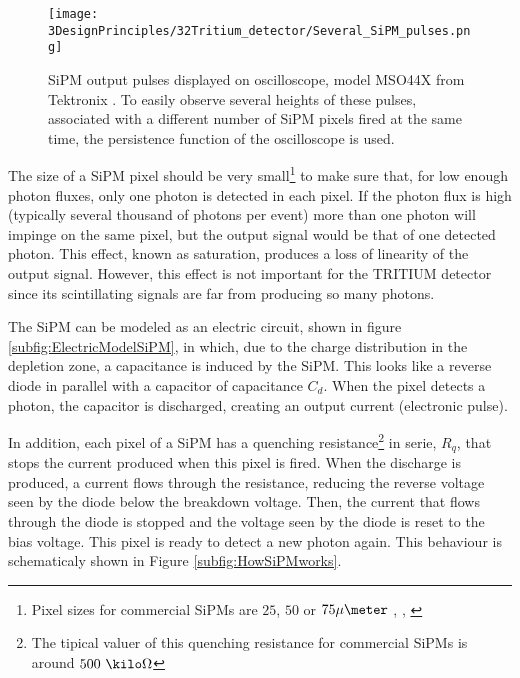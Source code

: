 \begin{figure}[h]
\centering
\texttt{[image: 3DesignPrinciples/32Tritium\_detector/Several\_SiPM\_pulses.png]}
\caption{SiPM output pulses displayed on oscilloscope, model MSO44X from Tektronix \cite{Oscilloscope}. To easily observe several heights of these pulses, associated with a different number of  SiPM pixels fired at the same time, the persistence function of the oscilloscope is used.\label{fig:PulsesOfSiPM}}
\end{figure}

The size of a SiPM pixel should be very small\footnote{Pixel sizes for commercial SiPMs are $25$, $50$ or $75\mu\meter$ \cite{DataSheetHammamatsu_1_SiPM_25}, \cite{DataSheetHammamatsu_1_SiPM_50}, \cite{DataSheetHammamatsu_1_SiPM_75}} to make sure that, for low enough photon fluxes, only one photon is detected in each pixel. If the photon flux is high (typically several thousand of photons per event) more than one photon will impinge on the same pixel, but the output signal would be that of one detected photon. This effect, known as saturation, produces a loss of linearity of the output signal. However, this effect is not important for the TRITIUM detector since its scintillating signals are far from producing so many photons. %

The SiPM can be modeled as an electric circuit, shown in figure \ref{subfig:ElectricModelSiPM}, in which, due to the charge distribution in the depletion zone, a capacitance is induced by the SiPM. This looks like a reverse diode in parallel with a capacitor of capacitance $C_d$. When the pixel detects a photon, the capacitor is discharged, creating an output current (electronic pulse).

In addition, each pixel of a SiPM has a quenching resistance\footnote{The tipical valuer of this quenching resistance for commercial SiPMs is around $500~\kilo\Omega$} in serie, $R_q$, that stops the current produced when this pixel is fired. When the discharge is produced, a current flows through the resistance, reducing the reverse voltage seen by the diode below the breakdown voltage. Then, the current that flows through the diode is stopped and the voltage seen by the diode is reset to the bias voltage. This pixel is ready to detect a new photon again. This behaviour is schematicaly shown in Figure \ref{subfig:HowSiPMworks}.

